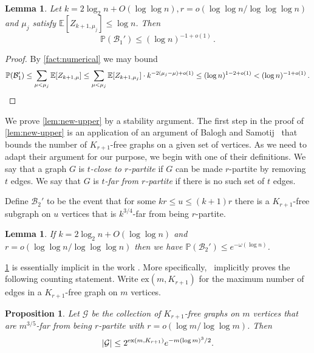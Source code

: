 \documentclass[11pt]{article}
\newtheorem{lemma}[theorem]{Lemma}
\newtheorem{proposition}[theorem]{Proposition}
\theoremstyle{definition}
\theoremstyle{remark}
\newcommand{\E}{\mathbb{E}}
\newcommand{\PP}{\mathbb{P}}
\newcommand{\cG}{\mathcal{G}}
\newcommand{\cB}{\mathcal{B}}
\begin{document}
\begin{lemma}\label{lem:no-fewer-defects}
     Let $k = 2\log_2 n + O(\log\log n), r = o(\log\log n / \log\log\log n)$ and $\mu_{j}$ satisfy $\E[ Z_{k+1,\mu_{j}}] \leq \log n$. Then $$\PP(\cB_1') \leq (\log n)^{-1 + o(1)}\,.$$
\end{lemma}
\begin{proof}
    By \cref{fact:numerical}  we may bound \begin{equation*} 
        \PP(\cB_1') \leq \sum_{\mu < \mu_{j}} \E [Z_{k+1,\mu}] \leq \sum_{\mu < \mu_{j}} \E [Z_{k+1,\mu_{j}}] \cdot k^{-2(\mu_{j} - \mu) + o(1)} \leq  (\log n)^{1-2+o(1)}<(\log n)^{-1 + o(1)}\,. \qedhere
    \end{equation*}
\end{proof}



We prove \cref{lem:new-upper} by a stability argument. 
The first step in the proof of \cref{lem:new-upper} is an application of an argument of Balogh
and Samotij~\cite{balogh2019efficient} that bounds the number of $ K_{r+1}$-free graphs on a given set of vertices. As we need to 
adapt their argument for our purpose, we begin with one of their definitions. We say
that a graph $G$ is {\em $t$-close to $r$-partite} if $G$ can be made $r$-partite by removing
$t$ edges. We say that $G$ is {\em $t$-far from $r$-partite} if there is no such set of $t$ edges. 

Define $\cB_2'$ to be the event that for some $kr \leq u \leq (k+1)r$ there is a $K_{r+1}$-free subgraph on $u$ vertices that is $k^{3/4}$-far from being $r$-partite.  

\begin{lemma} \label{lem:far}
If $k = 2\log_2 n + O(\log\log n)$ and $r = o(\log\log n / \log\log\log n)$ then
we have $\PP( \cB_2') \le  e^{ -\omega( \log n)}$.   
\end{lemma}
\cref{lem:far} is essentially implicit in the work \cite{balogh2019efficient}.  More specifically,~\cite{balogh2019efficient} implicitly proves the following counting statement.   Write $\mathrm{ex}(m,K_{r+1})$ for the maximum number of edges in a $K_{r+1}$-free graph on $m$ vertices. 
\begin{proposition}\label{prop:EKR-BS}
    Let $\cG$ be the collection of $K_{r+1}$-free graphs on $m$ vertices that are $m^{3/5}$-far from being $r$-partite with $r = o(\log m / \log\log m)$.  Then \begin{equation}
        | \cG| \le 2^{{\rm ex}(m, K_{r+1})}  e^{ - m (\log m)^3/2}.
    \end{equation} 
   \end{proposition} 
\end{document}
